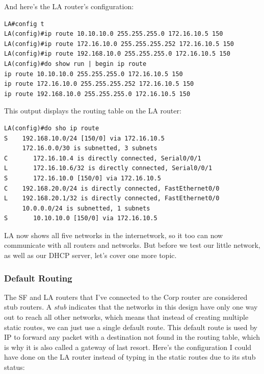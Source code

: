 \protect\hypertarget{c09.xhtmlux5cux23Page_387}{}{}And here's the LA
router's configuration:

\begin{verbatim}
LA#config t
LA(config)#ip route 10.10.10.0 255.255.255.0 172.16.10.5 150
LA(config)#ip route 172.16.10.0 255.255.255.252 172.16.10.5 150
LA(config)#ip route 192.168.10.0 255.255.255.0 172.16.10.5 150
LA(config)#do show run | begin ip route
ip route 10.10.10.0 255.255.255.0 172.16.10.5 150
ip route 172.16.10.0 255.255.255.252 172.16.10.5 150
ip route 192.168.10.0 255.255.255.0 172.16.10.5 150
\end{verbatim}

This output displays the routing table on the LA router:

\begin{verbatim}
LA(config)#do sho ip route
S    192.168.10.0/24 [150/0] via 172.16.10.5
     172.16.0.0/30 is subnetted, 3 subnets
C       172.16.10.4 is directly connected, Serial0/0/1
L       172.16.10.6/32 is directly connected, Serial0/0/1
S       172.16.10.0 [150/0] via 172.16.10.5
C    192.168.20.0/24 is directly connected, FastEthernet0/0
L    192.168.20.1/32 is directly connected, FastEthernet0/0
     10.0.0.0/24 is subnetted, 1 subnets
S       10.10.10.0 [150/0] via 172.16.10.5
\end{verbatim}

LA now shows all five networks in the internetwork, so it too can now
communicate with all routers and networks. But before we test our little
network, as well as our DHCP server, let's cover one more topic.

\subsubsection[Default
Routing]{\texorpdfstring{\protect\hypertarget{c09.xhtmlux5cux23c09-sec-11}{}{}Default
Routing}{Default Routing}}

The SF and LA routers that I've connected to the Corp router are
considered stub routers. A \emph{stub} indicates that the networks in
this design have only one way out to reach all other networks, which
means that instead of creating multiple static routes, we can just use a
single default route. This default route is used by IP to forward any
packet with a destination not found in the routing table, which is why
it is also called a gateway of last resort. Here's the configuration I
could have done on the LA router instead of typing in the static routes
due to its stub status:

